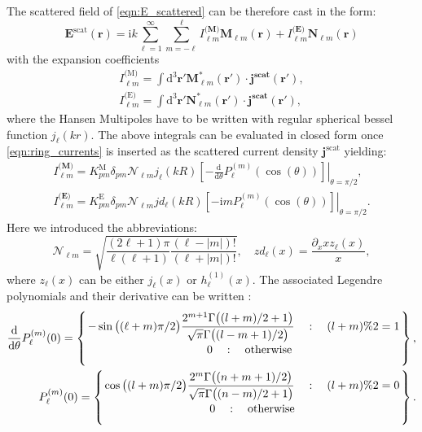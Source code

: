 \documentclass[a4paper,12pt]{scrartcl}  %
\newcommand{\imag}{\mathrm{i}}
\newcommand{\rd}{\mathrm{d}}
\newcommand\ontop[4]{\genfrac{#1}{#2}{0pt}{}{#3}{#4}}
\begin{document}
The scattered field of \cref{eqn:E_scattered} can be therefore cast in the form:
\begin{equation}
\mathbf{E}^\text{scat}(\mathbf{r}) = \imag k \sum_{\ell=1}^\infty  \sum_{m=-\ell}^\ell
I_{\ell m}^\textbf{(M)}\mathbf{M}_{\ell m}(\mathbf{r})+
I_{\ell m}^\textbf{(E)}\mathbf{N}_{\ell m}(\mathbf{r})
\label{eqn:Escat}
\end{equation}
with the expansion coefficients
\begin{align}
I_{\ell m}^\text{(M)} = \int \rd^3\mathbf{r}' \mathbf{M}^*_{\ell m}(\mathbf{r}')\cdot
\mathbf{j}^\textbf{scat}(\mathbf{r}'),\\
I_{\ell m}^\text{(E)} = \int \rd^3\mathbf{r}' \mathbf{N}^*_{\ell m}(\mathbf{r}')\cdot
\mathbf{j}^\textbf{scat}(\mathbf{r}'),
\end{align}
where the Hansen Multipoles have to be written with regular spherical bessel function $j_\ell(kr)$. The above integrals can be evaluated in closed form once \cref{eqn:ring_currents} is inserted as the scattered current density $\mathbf{j}^\text{scat}$ yielding:
\begin{align}
\left.I_{\ell m}^\textbf{(M)} = K^\mathrm{M}_{p m}\delta_{p m} \mathcal{N}_{\ell m} j_\ell(kR)\left[-\frac{\displaystyle\rd}{\rd \theta}P_{\ell}^{(m)}(\cos(\theta))
\right]\right \vert_{\theta=\pi/2},\\
\left.I_{\ell m}^\textbf{(E)} =  K^\mathrm{E}_{p m} \delta_{p m} \mathcal{N}_{\ell m}jd_\ell(kR)
\left[-\imag m 
P_\ell^{(m)}(\cos(\theta)) \right]\right\vert_{\theta=\pi/2}.
\end{align}
Here we introduced the abbreviations:
\begin{equation}
\mathcal{N}_{\ell m} = \sqrt{\frac{(2\ell+1)\pi}{\ell(\ell+1)}\frac{(\ell-|m|)!}{(\ell+|m|)!}},\quad
zd_\ell(x) = \frac{\partial_{x}  x z_\ell(x)}{x},
\end{equation}
where $z_\ell(x)$ can be either $j_\ell(x)$ or $h_\ell^{(1)}(x)$.
The associated Legendre polynomials and their derivative can be written \Cite{Leong1997}:
\begin{align}
\frac{\rd}{\rd \theta}P_\ell^{(m)}(0) =\left\{\ontop{}{}{
-\sin\big((\ell+m)\pi/2\big)\dfrac{2^{m+1}\Gamma\big((l+m)/2+1\big)}{\sqrt{\pi}\Gamma\big((l-m+1)/2\big) }
\quad : \quad (l+m)\%2=1}{\quad0\quad: \quad\text{otherwise}}\right\},
\label{eqn:Plm0diff}
\\
P_\ell^{(m)}(0) =
\left\{
\ontop{}{}{\cos\big((l+m)\pi/2\big)\dfrac{2^m \Gamma\big((n+m+1)/2\big)}{\sqrt{\pi}\Gamma\big((n-m)/2+1\big)}\quad:\quad (l+m)\%2=0}{0\quad:\quad \text{otherwise}}\right\}.
\label{eqn:Plm0}
\end{align}
\end{document}

